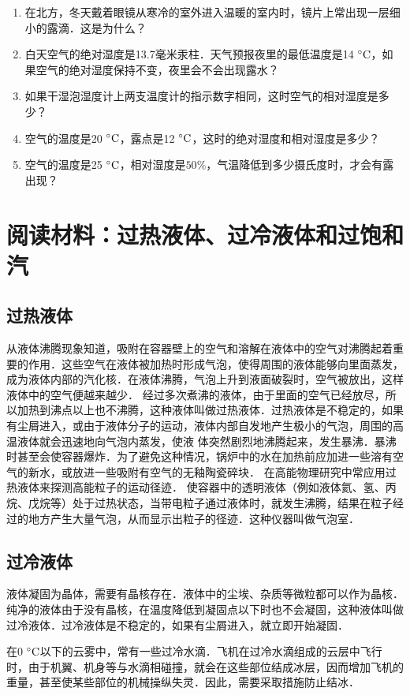 \begin{enumerate}
\item 在北方，冬天戴着眼镜从寒冷的室外进入温暖的室内时，镜片上常出现一层细小的露滴．这是为什么？
\item 白天空气的绝对湿度是13.7毫米汞柱．天气预报夜里的最低温度是14$\;{}^\circ\text{C}$，如果空气的绝对湿度保持不变，夜里会不会出现露水？
\item 如果干湿泡湿度计上两支温度计的指示数字相同，这时空气的相对湿度是多少？
\item 空气的温度是20$\;{}^\circ\text{C}$，露点是12$\;{}^\circ\text{C}$，这时的绝对湿度和相对湿度是多少？
\item 空气的温度是25$\;{}^\circ\text{C}$，相对湿度是$50\%$，气温降低到多少摄氏度时，才会有露出现？
\end{enumerate}

\section*{阅读材料：过热液体、过冷液体和过饱和汽}
\subsection*{过热液体} 

从液体沸腾现象知道，吸附在容器壁上的空气和溶解在液体中的空气对沸腾起着重要的作用．这些空气在液体被加热时形成气泡，使得周围的液体能够向里面蒸发，成为液体内部的汽化核．在液体沸腾，气泡上升到液面破裂时，空气被放出，这样液体中的空气便越来越少．
经过多次煮沸的液体，由于里面的空气已经放尽，所以加热到沸点以上也不沸腾，这种液体叫做过热液体．过热液体是不稳定的，如果有尘屑进入，或由于液体分子的运动，液体内部自发地产生极小的气泡，周围的高温液体就会迅速地向气泡内蒸发，使液
体突然剧烈地沸腾起来，发生暴沸．暴沸时甚至会使容器爆炸．为了避免这种情况，锅炉中的水在加热前应加进一些溶有空气的新水，或放进一些吸附有空气的无釉陶瓷碎块．
在高能物理研究中常应用过热液体来探测高能粒子的运动径迹．
使容器中的透明液体（例如液体氦、氢、丙烷、戊烷等）处于过热状态，当带电粒子通过液体时，就发生沸腾，结果在粒子经过的地方产生大量气泡，从而显示出粒子的径迹．这种仪器叫做气泡室．

\subsection*{过冷液体} 
液体凝固为晶体，需要有晶核存在．液体中的尘埃、杂质等微粒都可以作为晶核．
纯净的液体由于没有晶核，在温度降低到凝固点以下时也不会凝固，这种液体叫做过冷液体．过冷液体是不稳定的，如果有尘屑进入，就立即开始凝固．

在0$\;{}^\circ\text{C}$以下的云雾中，常有一些过冷水滴．飞机在过冷水滴组成的云层中飞行时，由于机翼、机身等与水滴相碰撞，就会在这些部位结成冰层，因而增加飞机的重量，甚至使某些部位的机械操纵失灵．因此，需要采取措施防止结冰．

